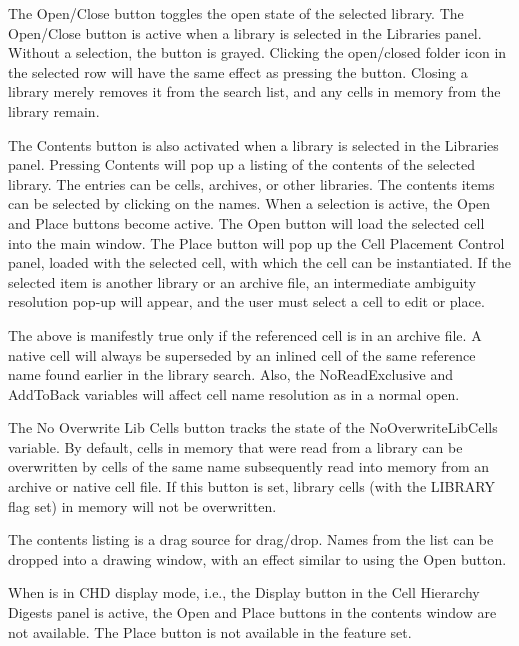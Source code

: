The {\cb Open/Close} button toggles the open state of the selected
library.  The {\cb Open/Close} button is active when a library is
selected in the {\cb Libraries} panel.  Without a selection, the
button is grayed.  Clicking the open/closed folder icon in the
selected row will have the same effect as pressing the button. 
Closing a library merely removes it from the search list, and any
cells in memory from the library remain.

The {\cb Contents} button is also activated when a library is selected
in the {\cb Libraries} panel.  Pressing {\cb Contents} will pop up a
listing of the contents of the selected library.  The entries can be
cells, archives, or other libraries.  The contents items can be
selected by clicking on the names.  When a selection is active, the
{\cb Open} and {\cb Place} buttons become active.  The {\cb Open}
button will load the selected cell into the main window.  The {\cb
Place} button will pop up the {\cb Cell Placement Control} panel,
loaded with the selected cell, with which the cell can be
instantiated.  If the selected item is another library or an archive
file, an intermediate ambiguity resolution pop-up will appear, and the
user must select a cell to edit or place.

The above is manifestly true only if the referenced cell is in an
archive file.  A native cell will always be superseded by an inlined
cell of the same reference name found earlier in the library search. 
Also, the {\et NoReadExclusive} and {\et AddToBack} variables will
affect cell name resolution as in a normal open.

The {\cb No Overwrite Lib Cells} button tracks the state of the {\et
NoOverwriteLibCells} variable.  By default, cells in memory that were
read from a library can be overwritten by cells of the same name
subsequently read into memory from an archive or native cell file.  If
this button is set, library cells (with the LIBRARY flag set) in
memory will not be overwritten.

The contents listing is a drag source for drag/drop.  Names from the
list can be dropped into a drawing window, with an effect similar to
using the {\cb Open} button.

When {\Xic} is in CHD display mode, i.e., the {\cb Display} button in
the {\cb Cell Hierarchy Digests} panel is active, the {\cb Open} and
{\cb Place} buttons in the contents window are not available.  The
{\cb Place} button is not available in the {\Xiv} feature set.


\ifoa
